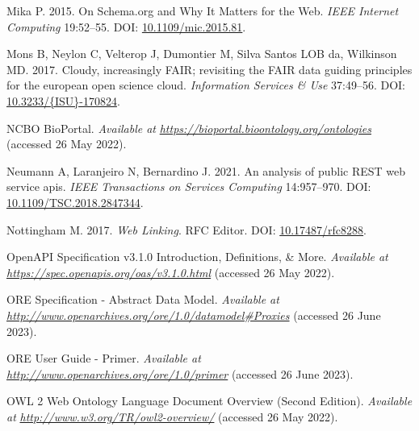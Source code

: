 \begin{CSLReferences}{1}{0}
\leavevmode{}%
Mika P. 2015. On Schema.org and Why It Matters for the Web. \emph{IEEE Internet Computing} 19:52--55. DOI: \href{https://doi.org/10.1109/mic.2015.81}{10.1109/mic.2015.81}.

\leavevmode{}%
Mons B, Neylon C, Velterop J, Dumontier M, Silva Santos LOB da, Wilkinson MD. 2017. Cloudy, increasingly FAIR; revisiting the FAIR data guiding principles for the european open science cloud. \emph{Information Services \& Use} 37:49--56. DOI: \href{https://doi.org/10.3233/\%7BISU\%7D-170824}{10.3233/\{ISU\}-170824}.

\leavevmode{}%
NCBO BioPortal. \emph{Available at} \href{https://bioportal.bioontology.org/ontologies}{\emph{https://bioportal.bioontology.org/ontologies}} (accessed 26 May 2022).

\leavevmode{}%
Neumann A, Laranjeiro N, Bernardino J. 2021. An analysis of public REST web service apis. \emph{IEEE Transactions on Services Computing} 14:957--970. DOI: \href{https://doi.org/10.1109/TSC.2018.2847344}{10.1109/TSC.2018.2847344}.

\leavevmode{}%
Nottingham M. 2017. \emph{Web Linking}. RFC Editor. DOI: \href{https://doi.org/10.17487/rfc8288}{10.17487/rfc8288}.

\leavevmode{}%
OpenAPI Specification v3.1.0 \textbar{} Introduction, Definitions, \& More. \emph{Available at} \href{https://spec.openapis.org/oas/v3.1.0.html}{\emph{https://spec.openapis.org/oas/v3.1.0.html}} (accessed 26 May 2022).

\leavevmode{}%
ORE Specification - Abstract Data Model. \emph{Available at} \href{http://www.openarchives.org/ore/1.0/datamodel\#Proxies}{\emph{http://www.openarchives.org/ore/1.0/datamodel\#Proxies}} (accessed 26 June 2023).

\leavevmode{}%
ORE User Guide - Primer. \emph{Available at} \href{http://www.openarchives.org/ore/1.0/primer}{\emph{http://www.openarchives.org/ore/1.0/primer}} (accessed 26 June 2023).

\leavevmode{}%
OWL 2 Web Ontology Language Document Overview (Second Edition). \emph{Available at} \href{http://www.w3.org/TR/owl2-overview/}{\emph{http://www.w3.org/TR/owl2-overview/}} (accessed 26 May 2022).


\end{CSLReferences}
